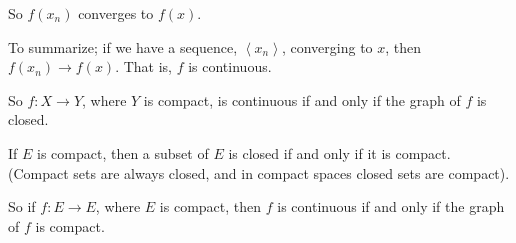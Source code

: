 \documentclass[a4paper,12pt]{article}
\newcommand{\tab}{\hspace{4mm}} %
\newcommand{\shunt}{\vspace{20mm}}
\newcommand{\anbrack}[1]{\left\langle #1 \right\rangle}
\begin{document}
\tab So $f(x_n)$ converges to $f(x)$.

\tab To summarize; if we have a sequence, $\anbrack{x_n}$, converging to $x$, then $f(x_n) \to f(x)$. That is, $f$ is continuous.

So $f: X \to Y$, where $Y$ is compact, is continuous if and only if the graph of $f$ is closed.

If $E$ is compact, then a subset of $E$ is closed if and only if it is compact. (Compact sets are always closed, and in compact spaces closed sets are compact).

So if $f: E \to E$, where $E$ is compact, then $f$ is continuous if and only if the graph of $f$ is compact.

\shunt
\end{document}
